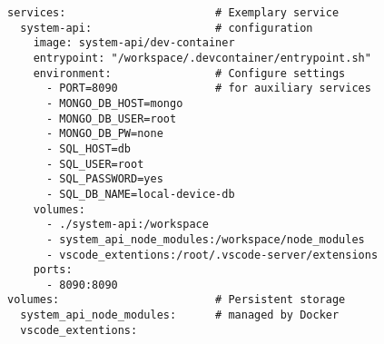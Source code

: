 
\begin{lstlisting}[language=docker-compose-2,caption={Auxiliary Services \code{docker-compose.yml}},breaklines=true,label={code::compose_service}]
services:                       # Exemplary service
  system-api:                   # configuration
    image: system-api/dev-container
    entrypoint: "/workspace/.devcontainer/entrypoint.sh"
    environment:                # Configure settings
      - PORT=8090               # for auxiliary services
      - MONGO_DB_HOST=mongo
      - MONGO_DB_USER=root
      - MONGO_DB_PW=none
      - SQL_HOST=db
      - SQL_USER=root
      - SQL_PASSWORD=yes
      - SQL_DB_NAME=local-device-db
    volumes:
      - ./system-api:/workspace
      - system_api_node_modules:/workspace/node_modules
      - vscode_extentions:/root/.vscode-server/extensions
    ports:
      - 8090:8090
volumes:                        # Persistent storage
  system_api_node_modules:      # managed by Docker
  vscode_extentions:
\end{lstlisting}
